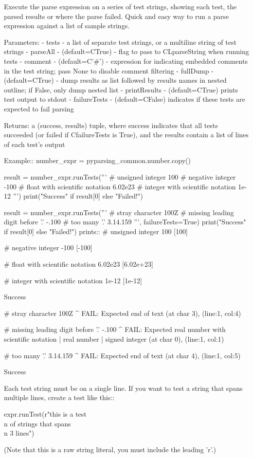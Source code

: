 \begin{DoxyVerb}Execute the parse expression on a series of test strings, showing each
test, the parsed results or where the parse failed. Quick and easy way to
run a parse expression against a list of sample strings.
   
Parameters:
 - tests - a list of separate test strings, or a multiline string of test strings
 - parseAll - (default=C{True}) - flag to pass to C{L{parseString}} when running tests           
 - comment - (default=C{'#'}) - expression for indicating embedded comments in the test 
      string; pass None to disable comment filtering
 - fullDump - (default=C{True}) - dump results as list followed by results names in nested outline;
      if False, only dump nested list
 - printResults - (default=C{True}) prints test output to stdout
 - failureTests - (default=C{False}) indicates if these tests are expected to fail parsing

Returns: a (success, results) tuple, where success indicates that all tests succeeded
(or failed if C{failureTests} is True), and the results contain a list of lines of each 
test's output

Example::
    number_expr = pyparsing_common.number.copy()

    result = number_expr.runTests('''
# unsigned integer
100
# negative integer
-100
# float with scientific notation
6.02e23
# integer with scientific notation
1e-12
''')
    print("Success" if result[0] else "Failed!")

    result = number_expr.runTests('''
# stray character
100Z
# missing leading digit before '.'
-.100
# too many '.'
3.14.159
''', failureTests=True)
    print("Success" if result[0] else "Failed!")
prints::
    # unsigned integer
    100
    [100]

    # negative integer
    -100
    [-100]

    # float with scientific notation
    6.02e23
    [6.02e+23]

    # integer with scientific notation
    1e-12
    [1e-12]

    Success
    
    # stray character
    100Z
       ^
    FAIL: Expected end of text (at char 3), (line:1, col:4)

    # missing leading digit before '.'
    -.100
    ^
    FAIL: Expected {real number with scientific notation | real number | signed integer} (at char 0), (line:1, col:1)

    # too many '.'
    3.14.159
^
    FAIL: Expected end of text (at char 4), (line:1, col:5)

    Success

Each test string must be on a single line. If you want to test a string that spans multiple
lines, create a test like this::

    expr.runTest(r"this is a test\\n of strings that spans \\n 3 lines")

(Note that this is a raw string literal, you must include the leading 'r'.)
\end{DoxyVerb}
